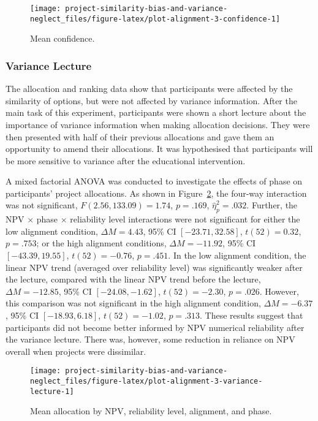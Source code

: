 \documentclass[
  english,
  man, donotrepeattitle,floatsintext]{apa7}
\theoremstyle{definition}
\theoremstyle{definition}
\theoremstyle{definition}
\theoremstyle{definition}
\theoremstyle{remark}
\begin{document}
\begin{figure}
\texttt{[image: project-similarity-bias-and-variance-neglect\_files/figure-latex/plot-alignment-3-confidence-1]} \caption{Mean confidence.}\label{fig:plot-alignment-3-confidence}
\end{figure}

\hypertarget{variance-lecture-1}{%
\subsubsection{Variance Lecture}\label{variance-lecture-1}}

The allocation and ranking data show that participants were affected by the
similarity of options, but were not affected by variance information. After the
main task of this experiment, participants were shown a short lecture about the
importance of variance information when making allocation decisions. They were
then presented with half of their previous allocations and gave them an
opportunity to amend their allocations. It was hypothesised that participants
will be more sensitive to variance after the educational intervention.

A mixed factorial ANOVA was conducted to investigate the effects of phase on
participants' project allocations. As shown in
Figure~\ref{fig:plot-alignment-3-variance-lecture}, the four-way interaction
was not significant,
\(F(2.56, 133.09) = 1.74\), \(p = .169\), \(\hat{\eta}^2_p = .032\).
Further, the NPV \(\times\) phase \(\times\) reliability level interactions were not
significant for either the low alignment condition,
\(\Delta M = 4.43\), 95\% CI \([-23.71, 32.58]\), \(t(52) = 0.32\), \(p = .753\); or the
high alignment conditions,
\(\Delta M = -11.92\), 95\% CI \([-43.39, 19.55]\), \(t(52) = -0.76\), \(p = .451\). In the
low alignment condition, the linear NPV trend (averaged over reliability level)
was significantly weaker after the lecture, compared with the linear NPV trend
before the lecture, \(\Delta M = -12.85\), 95\% CI \([-24.08, -1.62]\), \(t(52) = -2.30\), \(p = .026\).
However, this comparison was not significant in the high alignment condition,
\(\Delta M = -6.37\), 95\% CI \([-18.93, 6.18]\), \(t(52) = -1.02\), \(p = .313\). These results
suggest that participants did not become better informed by NPV numerical
reliability after the variance lecture. There was, however, some reduction in
reliance on NPV overall when projects were dissimilar.



\begin{figure}[!htbp]
\texttt{[image: project-similarity-bias-and-variance-neglect\_files/figure-latex/plot-alignment-3-variance-lecture-1]} \caption{Mean allocation by NPV, reliability level, alignment, and phase.}\label{fig:plot-alignment-3-variance-lecture}
\end{figure}
\end{document}

